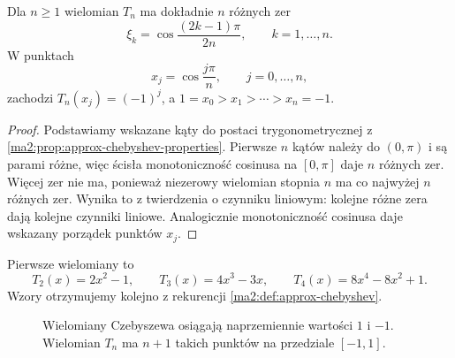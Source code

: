 \begin{stwierdzenie}
\label{ma2:prop:approx-chebyshev-nodes}
Dla $n\ge1$ wielomian $T_n$ ma dokładnie
$n$ różnych zer
\[
 \xi_k=\cos\frac{(2k-1)\pi}{2n},
 \qquad k=1,\ldots,n.
\]
W punktach
\[
 x_j=\cos\frac{j\pi}{n},
 \qquad j=0,\ldots,n,
\]
zachodzi $T_n(x_j)=(-1)^j$, a
$1=x_0>x_1>\cdots>x_n=-1$.
\end{stwierdzenie}
\begin{proof}
Podstawiamy wskazane kąty do postaci
trygonometrycznej z
\ref{ma2:prop:approx-chebyshev-properties}.
Pierwsze $n$ kątów należy do $(0,\pi)$
i są parami różne, więc ścisła monotoniczność
cosinusa na $[0,\pi]$ daje $n$ różnych zer.
Więcej zer nie ma, ponieważ niezerowy
wielomian stopnia $n$ ma co najwyżej $n$
różnych zer. Wynika to z twierdzenia
o czynniku liniowym: kolejne różne zera
dają kolejne czynniki liniowe.
Analogicznie monotoniczność cosinusa
daje wskazany porządek punktów $x_j$.
\end{proof}

Pierwsze wielomiany to
\[
 T_2(x)=2x^2-1,\qquad
 T_3(x)=4x^3-3x,\qquad
 T_4(x)=8x^4-8x^2+1.
\]
Wzory otrzymujemy kolejno z rekurencji
\ref{ma2:def:approx-chebyshev}.

\begin{figure}[htbp]
\centering
{}
\caption{Wielomiany Czebyszewa osiągają naprzemiennie
wartości $1$ i $-1$. Wielomian $T_n$ ma $n+1$
takich punktów na przedziale $[-1,1]$.}
\label{ma2:fig:approx-chebyshev}
\end{figure}

